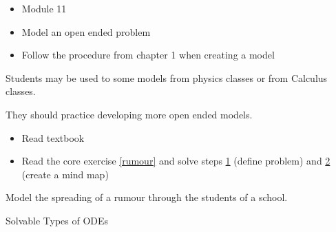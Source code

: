 \bookonlynewpage

\begin{lesson}

	\begin{itemize}
		\item Module 11
	\end{itemize}

	\begin{itemize}
		\item Model an open ended problem
		\item Follow the procedure from chapter 1 when creating a model
	\end{itemize}
	

Students may be used to some models from physics classes or from Calculus classes. 

They should practice developing more open ended models.

\begin{itemize}
	\item Read textbook
	\item Read the core exercise \ref{rumour} and solve steps \hyperref[moddefine]{1} (define problem) and \hyperref[mindmap]{2} (create a mind map)
\end{itemize}

\end{lesson}


\question \label{rumour} Model the spreading of a rumour through the students of a school.






\standardonlynewpage



\begin{module}{Solvable Types of ODEs}

	\label{ODE:solve}

	
	

\end{module}


